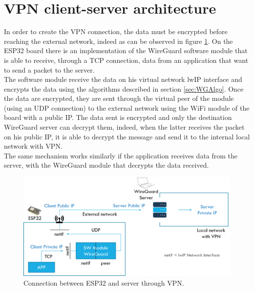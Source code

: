 \section{VPN client-server architecture}
In order to create the VPN connection, the data must be encrypted before reaching the external network, indeed as can be observed in figure \ref{fig:ESP32withVPN}. On the ESP32 board there is an implementation of the WireGuard software module that is able to receive, through a TCP connection, data from an application that want to send a packet to the server.
\\The software module receive the data on his virtual network lwIP interface and encrypts the data using the algorithms described in section \ref{sec:WGAlgo}. Once the data are encrypted, they are sent through the virtual peer of the module (using an UDP connection) to the external network using the WiFi module of the board with a public IP. 
The data sent is encrypted and only the destination WireGuard server can decrypt them, indeed, when the latter receives the packet on his public IP, it is able to decrypt the message and send it to the internal local network with VPN. \\
The same mechanism works similarly if the application receives data from the server, with the WireGuard module that decrypts the data received.

\begin{figure}[H]
    \vspace{0.5cm}
    \includegraphics[width=\textwidth]{images/ESP32_whit_VPN.png}
    \caption{Connection between ESP32 and server through VPN.}
    \label{fig:ESP32withVPN} %
\end{figure}

